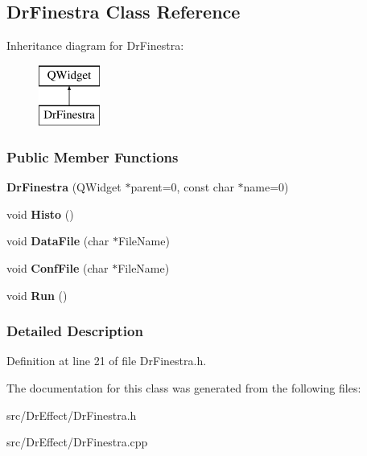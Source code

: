 \hypertarget{classDrFinestra}{}\subsection{Dr\+Finestra Class Reference}
\label{classDrFinestra}
Inheritance diagram for Dr\+Finestra\+:\begin{figure}[H]
\begin{center}
\leavevmode
\includegraphics[height=2.000000cm]{classDrFinestra}
\end{center}
\end{figure}
\subsubsection*{Public Member Functions}
\begin{DoxyCompactItemize}
\item 
{\bfseries Dr\+Finestra} (Q\+Widget $\ast$parent=0, const char $\ast$name=0)\hypertarget{classDrFinestra_af085fd34d2ae2fbd63c5e0ed97e5bb81}{}\label{classDrFinestra_af085fd34d2ae2fbd63c5e0ed97e5bb81}

\item 
void {\bfseries Histo} ()\hypertarget{classDrFinestra_a8121ce6dcaabd895864fcb398d61830a}{}\label{classDrFinestra_a8121ce6dcaabd895864fcb398d61830a}

\item 
void {\bfseries Data\+File} (char $\ast$File\+Name)\hypertarget{classDrFinestra_aafb2f0d8d425b1ae361f7bf1dd4c587f}{}\label{classDrFinestra_aafb2f0d8d425b1ae361f7bf1dd4c587f}

\item 
void {\bfseries Conf\+File} (char $\ast$File\+Name)\hypertarget{classDrFinestra_a418fd69a796855fc20dcdaf6bb94fc68}{}\label{classDrFinestra_a418fd69a796855fc20dcdaf6bb94fc68}

\item 
void {\bfseries Run} ()\hypertarget{classDrFinestra_aa3eca255b6be227d7d901cc2a72017a5}{}\label{classDrFinestra_aa3eca255b6be227d7d901cc2a72017a5}

\end{DoxyCompactItemize}


\subsubsection{Detailed Description}


Definition at line 21 of file Dr\+Finestra.\+h.



The documentation for this class was generated from the following files\+:\begin{DoxyCompactItemize}
\item 
src/\+Dr\+Effect/Dr\+Finestra.\+h\item 
src/\+Dr\+Effect/Dr\+Finestra.\+cpp\end{DoxyCompactItemize}
